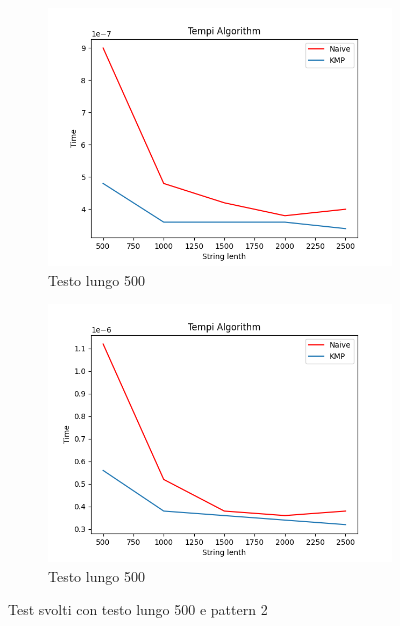\begin{figure}[H]
    \centering
    \begin{subfigure}[b]{0.49\textwidth}
        \centering
        \includegraphics[width=\textwidth]{Resources/lenght500_1.png}
        \caption{Testo lungo 500}
        \label{fig:lenght500_1}
    \end{subfigure}
    \hfill
    \begin{subfigure}[b]{0.49\textwidth}
        \centering
        \includegraphics[width=\textwidth]{Resources/lenght500_2.png}
        \caption{Testo lungo 500}
        \label{fig:lenght500_2}
    \end{subfigure}
    \caption{Test svolti con testo lungo 500 e pattern 2}
    \label{fig:test_500}
\end{figure}

